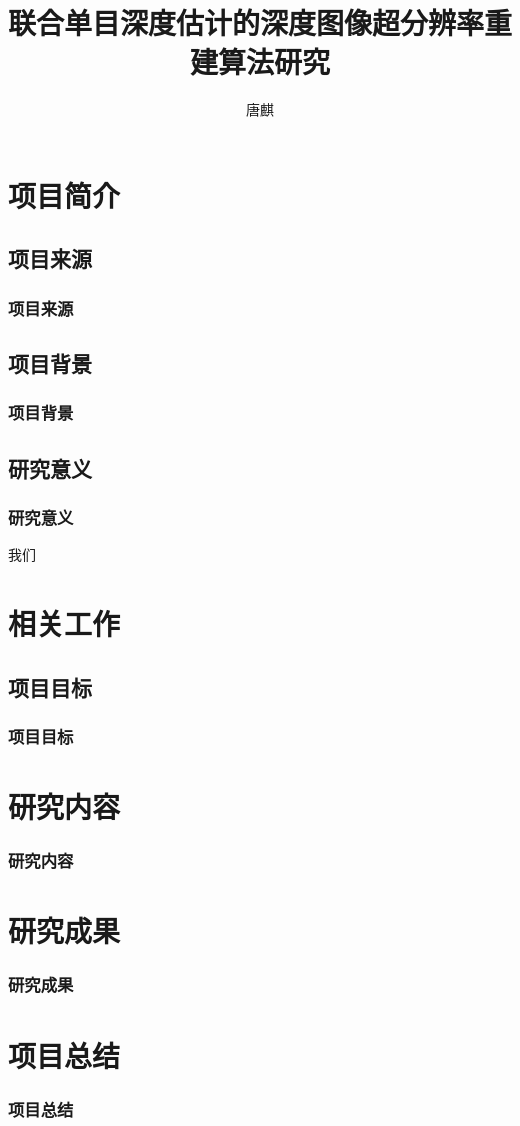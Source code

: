 \documentclass[aspectratio=169,12pt]{beamer}
\title{联合单目深度估计的深度图像超分辨率重建算法研究}
\author{唐麒}
\begin{document}
\maketitle
\makecontent

\section{项目简介}

\subsection{项目来源}
\begin{frame}
	\frametitle{项目来源}
\end{frame}

\subsection{项目背景}
\begin{frame}
	\frametitle{项目背景}
\end{frame}

\subsection{研究意义}
\begin{frame}
	\frametitle{研究意义}
	
	我们
\end{frame}

\section{相关工作}
\subsection{项目目标}
\begin{frame}
	\frametitle{项目目标}
\end{frame}

\section{研究内容}
\begin{frame}
	\frametitle{研究内容}
\end{frame}

\section{研究成果}
\begin{frame}
	\frametitle{研究成果}
\end{frame}

\section{项目总结}
\begin{frame}
	\frametitle{项目总结}
\end{frame}

\makebackcover
\end{document}

